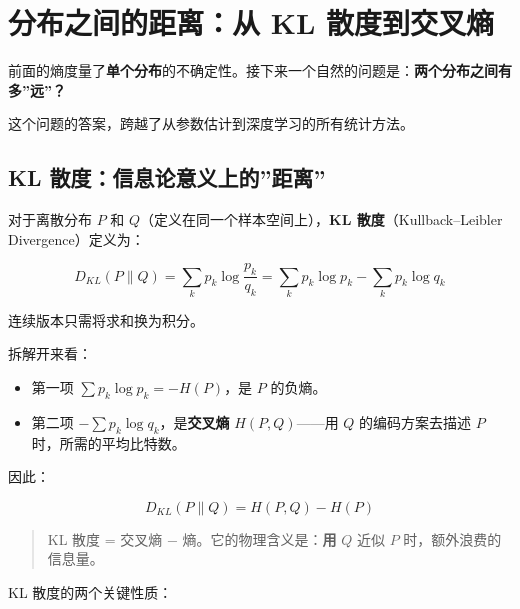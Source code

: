 \documentclass[
]{book}
\providecommand{\tightlist}{%
  \setlength{\itemsep}{0pt}\setlength{\parskip}{0pt}}
\begin{document}
\section{分布之间的距离：从 KL 散度到交叉熵}\label{ux5206ux5e03ux4e4bux95f4ux7684ux8dddux79bbux4ece-kl-ux6563ux5ea6ux5230ux4ea4ux53c9ux71b5}

前面的熵度量了\textbf{单个分布}的不确定性。接下来一个自然的问题是：\textbf{两个分布之间有多''远''？}

这个问题的答案，跨越了从参数估计到深度学习的所有统计方法。

\subsection{KL 散度：信息论意义上的''距离''}\label{kl-ux6563ux5ea6ux4fe1ux606fux8bbaux610fux4e49ux4e0aux7684ux8dddux79bb}

对于离散分布 \(P\) 和 \(Q\)（定义在同一个样本空间上），\textbf{KL 散度}（Kullback--Leibler Divergence）定义为：

\[D_{KL}(P \parallel Q) = \sum_{k} p_k \log \frac{p_k}{q_k} = \sum_k p_k \log p_k - \sum_k p_k \log q_k\]

连续版本只需将求和换为积分。

拆解开来看：

\begin{itemize}
\tightlist
\item
  第一项 \(\sum p_k \log p_k = -H(P)\)，是 \(P\) 的负熵。
\item
  第二项 \(-\sum p_k \log q_k\)，是\textbf{交叉熵} \(H(P, Q)\)------用 \(Q\) 的编码方案去描述 \(P\) 时，所需的平均比特数。
\end{itemize}

因此：

\[D_{KL}(P \parallel Q) = H(P, Q) - H(P)\]

\begin{quote}
KL 散度 = 交叉熵 − 熵。它的物理含义是：\textbf{用} \(Q\) 近似 \(P\) 时，额外浪费的信息量。
\end{quote}

KL 散度的两个关键性质：
\end{document}
